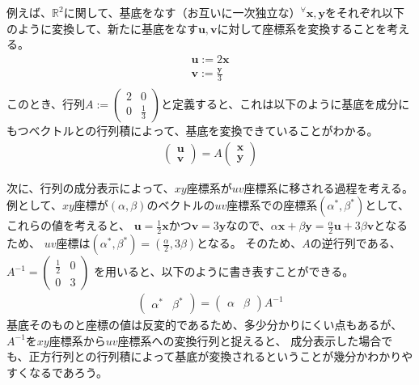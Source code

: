 \documentclass[10pt]{ujarticle}
\begin{document}
例えば、$\mathbb{R}^2$に関して、基底をなす（お互いに一次独立な）$^\forall\mathbf{x,y}$をそれぞれ以下のように変換して、新たに基底をなす$\mathbf{u,v}$に対して座標系を変換することを考える。
$$
\begin{aligned}
  \mathbf{u}:=2\mathbf{x}\\
  \mathbf{v}:=\frac{\mathbf{y}}{3}\\
\end{aligned}
$$
このとき、行列$A:=(\begin{smallmatrix}2&0\\0&\frac{1}{3}\end{smallmatrix})$と定義すると、これは以下のように基底を成分にもつベクトルとの行列積によって、基底を変換できていることがわかる。
$$
\begin{aligned}
  \begin{pmatrix}
    \mathbf{u}\\\mathbf{v}
  \end{pmatrix}=A\begin{pmatrix}
    \mathbf{x}\\
    \mathbf{y}
  \end{pmatrix}
\end{aligned}
$$

次に、行列の成分表示によって、$xy$座標系が$uv$座標系に移される過程を考える。例として、$xy$座標が$(\alpha, \beta)$のベクトルの$uv$座標系での座標系$(\alpha^*, \beta^*)$として、これらの値を考えると、
$\mathbf{u}=\frac{1}{2}\mathbf{x}$かつ$\mathbf{v}=3\mathbf{y}$なので、$\alpha\mathbf{x}+\beta\mathbf{y}=\frac{\alpha}{2}\mathbf{u}+3\beta\mathbf{v}$となるため、
$uv$座標は$(\alpha^*, \beta^*)=(\frac{\alpha}{2}, 3\beta)$となる。
そのため、$A$の逆行列である、$A^{-1}=(\begin{smallmatrix}\frac{1}{2}&0\\0&3\end{smallmatrix})$
を用いると、以下のように書き表すことができる。
$$
\begin{aligned}
  \begin{pmatrix}
    \alpha^* & \beta^*
  \end{pmatrix}=\begin{pmatrix}
    \alpha & \beta
  \end{pmatrix}A^{-1}
\end{aligned}
$$
基底そのものと座標の値は反変的であるため、多少分かりにくい点もあるが、$A^{-1}$を$xy$座標系から$uv$座標系への変換行列と捉えると、
成分表示した場合でも、正方行列との行列積によって基底が変換されるということが幾分かわかりやすくなるであろう。
\end{document}
